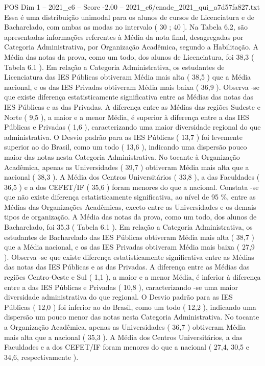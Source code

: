 \begin{textsample}{POS Dim 1 – 2021\_c6 – Score -2.00 – 2021\_c6/enade\_2021\_qui\_a7d57fa827.txt}
Essa é uma distribuição unimodal para os alunos de cursos de Licenciatura e de Bacharelado, com ambas as modas no intervalo ( 30 ; 40 ].
Na Tabela 6.2, são apresentadas informações referentes à Média da nota final, desagregadas por Categoria Administrativa, por Organização Acadêmica, segundo a Habilitação.
A Média das notas da prova, como um todo, dos alunos de Licenciatura, foi 38,3 ( Tabela 6.1 ).
Em relação a Categoria Administrativa, os estudantes de Licenciatura das IES Públicas obtiveram Média mais alta ( 38,5 ) que a Média nacional, e os das IES Privadas obtiveram Média mais baixa ( 36,9 ).
Observa -se que existe diferença estatisticamente significativa entre as Médias das notas das IES Públicas e as das Privadas.
A diferença entre as Médias das regiões Sudeste e Norte ( 9,5 ), a maior e a menor Média, é superior à diferença entre a das IES Públicas e Privadas ( 1,6 ), caracterizando uma maior diversidade regional do que administrativa.
O Desvio padrão para as IES Públicas ( 13,7 ) foi levemente superior ao do Brasil, como um todo ( 13,6 ), indicando uma dispersão pouco maior das notas nesta Categoria Administrativa.
No tocante à Organização Acadêmica, apenas as Universidades ( 39,7 ) obtiveram Média mais alta que a nacional ( 38,3 ).
A Média dos Centros Universitários ( 33,8 ), a das Faculdades ( 36,5 ) e a dos CEFET/IF ( 35,6 ) foram menores do que a nacional.
Constata -se que não existe diferença estatisticamente significativa, ao nível de 95 \%, entre as Médias das Organizações Acadêmicas, exceto entre as Universidades e os demais tipos de organização.
A Média das notas da prova, como um todo, dos alunos de Bacharelado, foi 35,3 ( Tabela 6.1 ).
Em relação a Categoria Administrativa, os estudantes de Bacharelado das IES Públicas obtiveram Média mais alta ( 38,7 ) que a Média nacional, e os das IES Privadas obtiveram Média mais baixa ( 27,9 ).
Observa -se que existe diferença estatisticamente significativa entre as Médias das notas das IES Públicas e as das Privadas.
A diferença entre as Médias das regiões Centro-Oeste e Sul ( 1,1 ), a maior e a menor Média, é inferior à diferença entre a das IES Públicas e Privadas ( 10,8 ), caracterizando -se uma maior diversidade administrativa do que regional.
O Desvio padrão para as IES Públicas ( 12,0 ) foi inferior ao do Brasil, como um todo ( 12,2 ), indicando uma dispersão um pouco menor das notas nesta Categoria Administrativa.
No tocante a Organização Acadêmica, apenas as Universidades ( 36,7 ) obtiveram Média mais alta que a nacional ( 35,3 ).
A Média dos Centros Universitários, a das Faculdades e a dos CEFET/IF foram menores do que a nacional ( 27,4, 30,5 e 34,6, respectivamente ).

\end{textsample}
